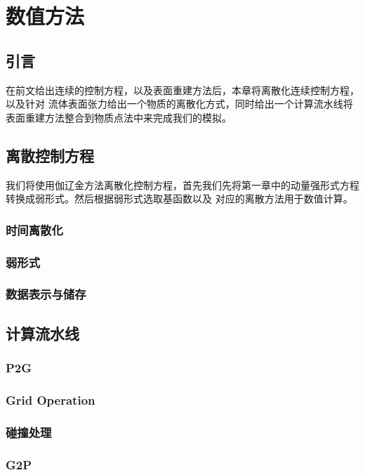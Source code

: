 \chapter{数值方法} \label{chap4}
\section{引言}
在前文给出连续的控制方程，以及表面重建方法后，本章将离散化连续控制方程，以及针对
流体表面张力给出一个物质的离散化方式，同时给出一个计算流水线将表面重建方法整合到物质点法中来完成我们的模拟。
\section{离散控制方程}
我们将使用伽辽金方法离散化控制方程，首先我们先将第一章中的动量强形式方程转换成弱形式。然后根据弱形式选取基函数以及
对应的离散方法用于数值计算。
\subsection{时间离散化}
\subsection{弱形式}
\subsection{数据表示与储存}

\section{计算流水线}
\subsection{P2G}
\subsection{Grid Operation}
\subsection{碰撞处理}
\subsection{G2P}

